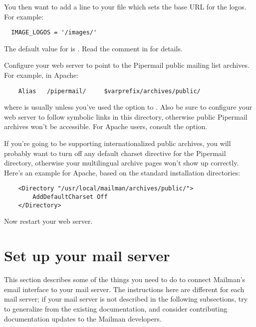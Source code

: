 \documentclass{howto}
\begin{document}
You then want to add a line to your 
file which sets the base URL for the logos.  For example:

\begin{verbatim}
  IMAGE_LOGOS = '/images/'
\end{verbatim}

The default value for  is .  Read the comment
in  for details.

Configure your web server to point to the Pipermail public mailing list
archives.  For example, in Apache:

\begin{verbatim}
    Alias   /pipermail/     $varprefix/archives/public/
\end{verbatim}

where  is usually  unless you've used the
 option to .  Also be
sure to configure your web server to follow symbolic links in this directory,
otherwise public Pipermail archives won't be accessible.  For Apache users,
consult the  option.

If you're going to be supporting internationalized public archives, you will
probably want to turn off any default charset directive for the Pipermail
directory, otherwise your multilingual archive pages won't show up correctly.
Here's an example for Apache, based on the standard installation directories:

\begin{verbatim}
    <Directory "/usr/local/mailman/archives/public/">
        AddDefaultCharset Off
    </Directory>
\end{verbatim}

Now restart your web server.

\section{Set up your mail server\label{mail-server}}

This section describes some of the things you need to do to connect Mailman's
email interface to your mail server.  The instructions here are different for
each mail server; if your mail server is not described in the following
subsections, try to generalize from the existing documentation, and consider
contributing documentation updates to the Mailman developers.
\end{document}
